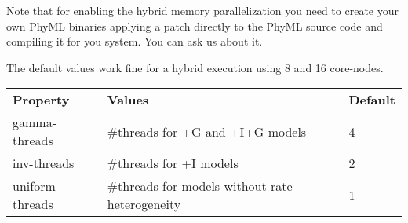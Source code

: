 Note that for enabling the hybrid memory parallelization you need to create your own PhyML binaries applying a patch directly to the PhyML source code and compiling it for you system. You can ask us about it.

The default values work fine for a hybrid execution using 8 and 16 core-nodes.

\begin{center}
\begin{tabular}{|l|l|l|}
\hline
{\bf Property} & {\bf Values} & {\bf Default} \\
gamma-threads  & \#threads for +G and +I+G models & 4 \\
inv-threads    & \#threads for +I models & 2 \\
uniform-threads& \#threads for models without rate heterogeneity & 1 \\
\hline
\end{tabular}
\end{center}
